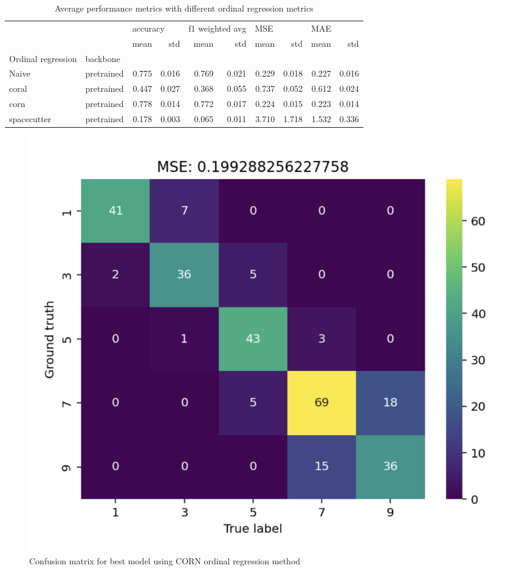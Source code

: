 \documentclass[english]{article}
\begin{document}
\begin{table}[H]
    \centering
    \caption{Average performance metrics with different ordinal regression metrics}
    \label{tab:dtafracevol}
    \begin{tabular}{llrrrrrrrr}
        \toprule
                           &            & \multicolumn{2}{l}{accuracy} & \multicolumn{2}{l}{f1 weighted avg} & \multicolumn{2}{l}{MSE} & \multicolumn{2}{l}{MAE}                                 \\
                           &            & mean                         & std                                 & mean                    & std                     & mean  & std   & mean  & std   \\
        Ordinal regression & backbone   &                              &                                     &                         &                         &       &       &       &       \\
        \midrule
        Naive              & pretrained & 0.775                        & 0.016                               & 0.769                   & 0.021                   & 0.229 & 0.018 & 0.227 & 0.016 \\
        coral              & pretrained & 0.447                        & 0.027                               & 0.368                   & 0.055                   & 0.737 & 0.052 & 0.612 & 0.024 \\
        corn               & pretrained & 0.778                        & 0.014                               & 0.772                   & 0.017                   & 0.224 & 0.015 & 0.223 & 0.014 \\
        spacecutter        & pretrained & 0.178                        & 0.003                               & 0.065                   & 0.011                   & 3.710 & 1.718 & 1.532 & 0.336 \\
        \bottomrule
    \end{tabular}
\end{table}

\begin{figure}[H]
    \begin{center}
        \includegraphics[width=0.7\linewidth]{2023_a_oiv_cm}
        \caption{Confusion matrix for best model using CORN ordinal regression method}\label{fig:oivcm}
    \end{center}
\end{figure}
\end{document}
